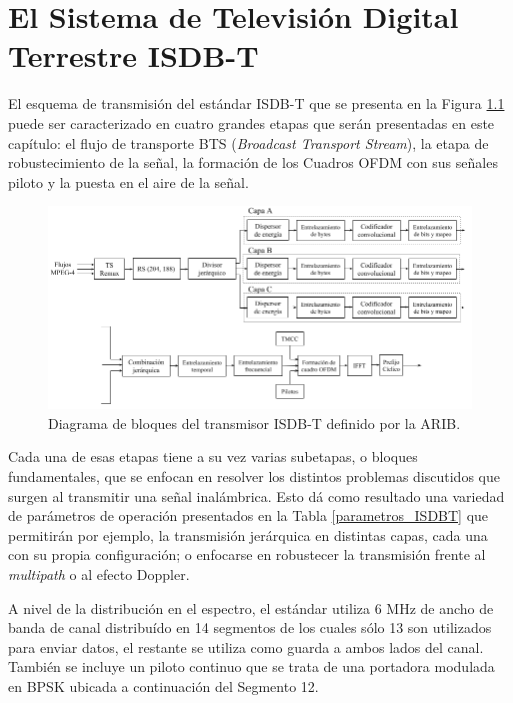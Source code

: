 \chapter{El Sistema de Televisión Digital Terrestre ISDB-T}

El esquema de transmisión del estándar ISDB-T que se presenta en la Figura \ref{f:esquema-tx} puede ser caracterizado en cuatro grandes etapas que serán presentadas en este capítulo: el flujo de transporte BTS (\textit{Broadcast Transport Stream}), la etapa de robustecimiento de la señal, la formación de los Cuadros OFDM con sus señales piloto y la puesta en el aire de la señal.

\begin{figure}[h!]
\centering
\includegraphics[scale=0.46]{figuras/cap03/esquema-tx}
\caption{\label{f:esquema-tx} Diagrama de bloques del transmisor ISDB-T definido por la ARIB.}
\end{figure}



Cada una de esas etapas tiene a su vez varias subetapas, o bloques fundamentales, que se enfocan en resolver los distintos problemas discutidos que surgen al transmitir una señal inalámbrica. Esto dá como resultado una variedad de parámetros de operación presentados en la Tabla \ref{parametros_ISDBT} que permitirán por ejemplo, la transmisión jerárquica en distintas capas, cada una con su propia configuración; o enfocarse en robustecer la transmisión frente al \textit{multipath} o al efecto Doppler.

A nivel de la distribuci\'on en el espectro, el estándar utiliza 6 MHz de ancho de banda de canal distribu\'ido en 14 segmentos de los cuales sólo 13 son utilizados para enviar datos, el restante se utiliza como guarda a ambos lados del canal. Tambi\'en se incluye un piloto continuo que se trata de una portadora modulada en BPSK ubicada a continuaci\'on del Segmento 12.

